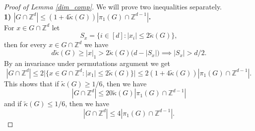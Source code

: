\documentclass[10pt,a4paper]{amsart}
\numberwithin{equation}{section}
\newcommand{\Z}{\mathbb{Z}}
\begin{document}
\begin{proof}[Proof of Lemma \ref{dim_comp}]
We will prove two inequalities separately.
\\
\textbf{1) $ |G \cap \Z^d| \le (1+4 \widetilde{\kappa}(G)) | \pi_1(G) \cap \Z^{d-1} |$.} \\
For $x \in G \cap \Z^d$ let 
\[
S_x=\Big\{ i \in [d]: |x_i| \le 2\widetilde{\kappa}(G) \Big\}, 
\]
then for every $x \in G \cap \Z^d$ we have
\[
d \widetilde{\kappa}(G) \ge |x|_1 > 2 \widetilde{\kappa}(G) \big(d-|S_x|\big) \implies |S_x| >d/2.
\]
By an invariance under permutations argument we get
\[
|G \cap \Z^d| \le 2 \big|\big\{ x \in G \cap \Z^d : |x_1| \le 2 \widetilde{\kappa}(G)\big\} \big| \le 2(1+4 \widetilde{\kappa}(G)) |\pi_1(G) \cap \Z^{d-1}|.
\]
This shows that if $\widetilde{\kappa}(G) \ge 1/6$, then we have 
\[
|G \cap \Z^d| \le 20\widetilde{\kappa}(G) | \pi_1(G) \cap \Z^{d-1} |
\]
and if $\widetilde{\kappa}(G) \le 1/6$, then we have
\[
|G \cap \Z^d| \le 4 | \pi_1(G) \cap \Z^{d-1} |.
\]


\end{proof}
\end{document}
